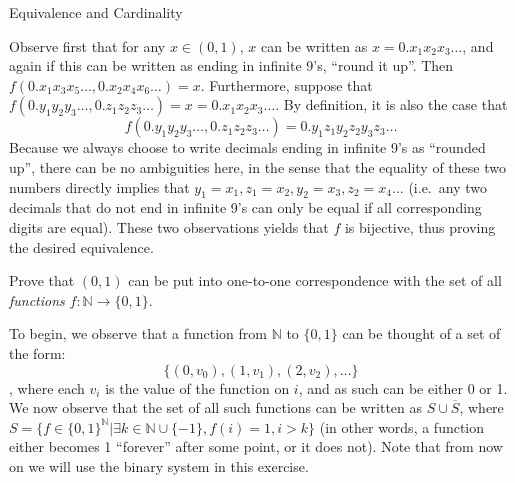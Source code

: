 \begin{section}{Equivalence and Cardinality}
\begin{solution}
    Observe first that for any $x \in (0, 1)$, $x$ can be written as $x = 0.x_1x_2x_3\ldots$, and again if this can be written as ending in infinite 9's, ``round it up''. 
    Then $f(0.x_1x_3x_5\ldots, 0.x_2x_4x_6\ldots) = x$. 
    Furthermore, suppose that $f(0.y_1y_2y_3\ldots, 0.z_1z_2z_3\ldots) = x = 0.x_1x_2x_3\ldots$. 
    By definition, it is also the case that 
    $$f(0.y_1y_2y_3\ldots, 0.z_1z_2z_3\ldots) = 0.y_1z_1y_2z_2y_3z_3\ldots$$
    Because we always choose to write decimals ending in infinite 9's as ``rounded up'', there can be no ambiguities here, in the sense that the equality of these two numbers directly implies that $y_1 = x_1, z_1 = x_2, y_2 = x_3, z_2 = x_4 \ldots$ (i.e.\, any two decimals that do not end in infinite 9's can only be equal if all corresponding digits are equal).
    These two observations yields that $f$ is bijective, thus proving the desired equivalence.
\end{solution}

\begin{exercise}{10}
    Prove that $(0, 1)$ can be put into one-to-one correspondence with the set of all \textit{functions} $f: \mathbb{N} \rightarrow \{0, 1\}$.
\end{exercise}

\begin{solution}

    To begin, we observe that a function from $\mathbb{N}$ to $\{0, 1\}$ can be thought of a set of the form:
    $$\{(0, v_0), (1, v_1), (2, v_2), \ldots \}$$,
    where each $v_i$ is the value of the function on $i$, and as such can be either 0 or 1.
    We now observe that the set of all such functions can be written as $S \cup \overline{S}$, where $S = \{f \in \{0, 1\}^{\mathbb{N}} \lvert \exists k \in \mathbb{N} \cup \{-1\}, f(i) = 1, i > k\}$ (in other words, a function either becomes 1 ``forever'' after some point, or it does not).
    Note that from now on we will use the binary system in this exercise.


\end{solution}
\end{section}
